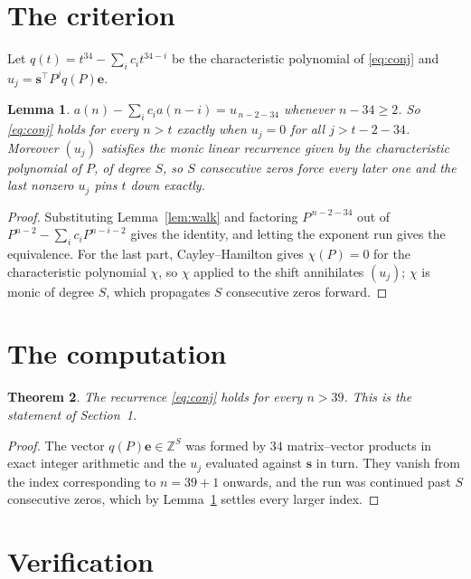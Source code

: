 \documentclass[11pt,a4paper]{article}
\theoremstyle{plain}
\newtheorem{theorem}{Theorem}
\newtheorem{lemma}[theorem]{Lemma}
\theoremstyle{definition}
\begin{document}
\section{The criterion}

Let $q(t)=t^{34}-\sum_i c_i t^{34-i}$ be the characteristic polynomial of
\eqref{eq:conj} and $u_j=\mathbf{s}^{\!\top}P^{j}q(P)\mathbf{e}$.

\begin{lemma}\label{lem:crit}
$a(n)-\sum_i c_i a(n-i)=u_{\,n-2-34}$ whenever $n-34\ge2$. So \eqref{eq:conj}
holds for every $n>t$ exactly when $u_j=0$ for all $j>t-2-34$. Moreover $(u_j)$
satisfies the monic linear recurrence given by the characteristic polynomial of $P$, of
degree $S$, so $S$ consecutive zeros force every later one and the last nonzero $u_j$ pins
$t$ down exactly.
\end{lemma}

\begin{proof}
Substituting Lemma~\ref{lem:walk} and factoring $P^{\,n-2-34}$ out of
$P^{n-2}-\sum_i c_i P^{n-i-2}$ gives the identity, and letting the exponent run gives the
equivalence. For the last part, Cayley--Hamilton gives $\chi(P)=0$ for the characteristic
polynomial $\chi$, so $\chi$ applied to the shift annihilates $(u_j)$; $\chi$ is monic of
degree $S$, which propagates $S$ consecutive zeros forward.
\end{proof}

\section{The computation}

\begin{theorem}
The recurrence \eqref{eq:conj} holds for every $n>39$. This is the statement of
Section~1.
\end{theorem}

\begin{proof}
The vector $q(P)\mathbf{e}\in\mathbb{Z}^{S}$ was formed by $34$ matrix--vector
products in exact integer arithmetic and the $u_j$ evaluated against $\mathbf{s}$ in turn.
They vanish from the index corresponding to $n=39+1$ onwards, and the run was continued
past $S$ consecutive zeros, which by Lemma~\ref{lem:crit} settles every larger index.
\end{proof}

\section{Verification}
\end{document}
